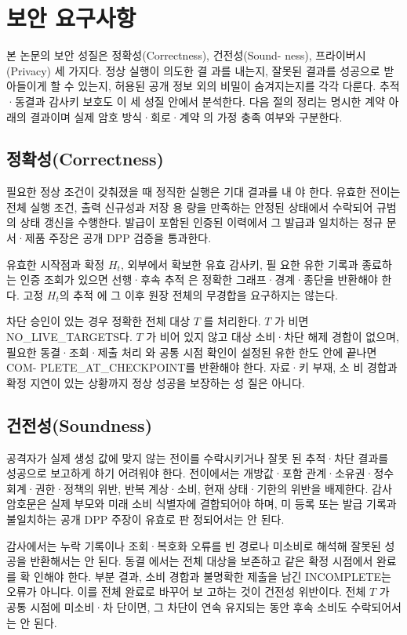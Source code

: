 \section{보안 요구사항}
본 논문의 보안 성질은 정확성(Correctness), 건전성(Sound-
ness), 프라이버시(Privacy) 세 가지다. 정상 실행이 의도한 결
과를 내는지, 잘못된 결과를 성공으로 받아들이게 할 수 있는지,
허용된 공개 정보 외의 비밀이 숨겨지는지를 각각 다룬다. 추적
·동결과 감사키 보호도 이 세 성질 안에서 분석한다. 다음 절의
정리는 명시한 계약 아래의 결과이며 실제 암호 방식·회로·계약
의 가정 충족 여부와 구분한다.

\subsection{정확성(Correctness)}
필요한 정상 조건이 갖춰졌을 때 정직한 실행은 기대 결과를 내
야 한다. 유효한 전이는 전체 실행 조건, 출력 신규성과 저장 용
량을 만족하는 안정된 상태에서 수락되어 규범의 상태 갱신을
수행한다. 발급이 포함된 인증된 이력에서 그 발급과 일치하는
정규 문서·제품 주장은 공개 DPP 검증을 통과한다.

유효한 시작점과 확정 \(H_{t}\), 외부에서 확보한 유효 감사키, 필
요한 유한 기록과 종료하는 인증 조회가 있으면 선행·후속 추적
은 정확한 그래프·경계·종단을 반환해야 한다. 고정 \(H_{t}\)의 추적
에 그 이후 원장 전체의 무경합을 요구하지는 않는다.

차단 승인이 있는 경우 정확한 전체 대상 \(T\) 를 처리한다.
\(T\) 가 비면 NO\_LIVE\_TARGETS다. \(T\) 가 비어 있지 않고 대상
소비·차단 해제 경합이 없으며, 필요한 동결·조회·제출 처리
와 공통 시점 확인이 설정된 유한 한도 안에 끝나면 COM-
PLETE\_AT\_CHECKPOINT를 반환해야 한다. 자료·키 부재, 소
비 경합과 확정 지연이 있는 상황까지 정상 성공을 보장하는 성
질은 아니다.


\subsection{건전성(Soundness)}
공격자가 실제 생성 값에 맞지 않는 전이를 수락시키거나 잘못
된 추적·차단 결과를 성공으로 보고하게 하기 어려워야 한다.
전이에서는 개방값·포함 관계·소유권·정수 회계·권한·정책의
위반, 반복 계상·소비, 현재 상태·기한의 위반을 배제한다. 감사
암호문은 실제 부모와 미래 소비 식별자에 결합되어야 하며, 미
등록 또는 발급 기록과 불일치하는 공개 DPP 주장이 유효로 판
정되어서는 안 된다.

감사에서는 누락 기록이나 조회·복호화 오류를 빈 경로나
미소비로 해석해 잘못된 성공을 반환해서는 안 된다. 동결
에서는 전체 대상을 보존하고 같은 확정 시점에서 완료를 확
인해야 한다. 부분 결과, 소비 경합과 불명확한 제출을 남긴
INCOMPLETE는 오류가 아니다. 이를 전체 완료로 바꾸어 보
고하는 것이 건전성 위반이다. 전체 \(T\) 가 공통 시점에 미소비·차
단이면, 그 차단이 연속 유지되는 동안 후속 소비도 수락되어서
는 안 된다.

